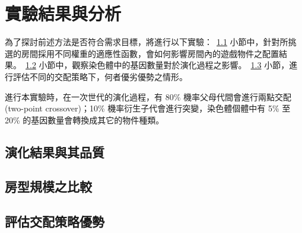 \renewcommand\thetable{\arabic{chapter}-\arabic{table}}
\chapter{實驗結果與分析}
\label{cha:experimentresult}

為了探討前述方法是否符合需求目標，將進行以下實驗：~\ref{sec:experimentresult-xxx} 小節中，針對所挑選的房間採用不同權重的適應性函數，會如何影響房間內的遊戲物件之配置結果。~\ref{sec:experimentresult-yyy} 小節中，觀察染色體中的基因數量對於演化過程之影響。~\ref{sec:experimentresult-zzz} 小節，進行評估不同的交配策略下，何者優劣優勢之情形。

進行本實驗時，在一次世代的演化過程，有 80\% 機率父母代間會進行兩點交配 (two-point crossover)；10\% 機率衍生子代會進行突變，染色體個體中有 5\% 至 20\% 的基因數量會轉換成其它的物件種類。


\section{演化結果與其品質}
\label{sec:experimentresult-xxx}



\section{房型規模之比較}
\label{sec:experimentresult-yyy}




\section{評估交配策略優勢}
\label{sec:experimentresult-zzz}


